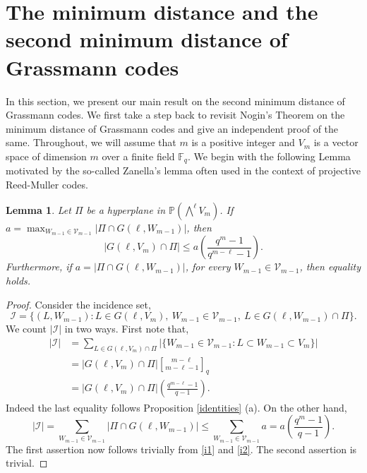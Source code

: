 \documentclass[10pt,a4paper,oneside]{amsproc}
\newtheorem{lemma}[theorem]{Lemma}
\newcommand{\Fq}{\mathbb{F}_q}
\def\Fq{{\mathbb F}_q}
\def\PP{{\mathbb P}}
\newcommand{\V}{{\mathcal{V}}}
\begin{document}
\section{The minimum distance and the second minimum distance of Grassmann codes}\label{sec:main}
In this section, we present our main result on the second minimum distance of Grassmann codes. We first take a step back to revisit Nogin's Theorem on the minimum distance of Grassmann codes and give an independent proof of the same. Throughout, we will assume that $m$ is a positive integer and $V_m$ is a vector space of dimension $m$ over a finite field $\Fq$. 
We begin with the following Lemma motivated by the so-called Zanella's lemma often used in the context of projective Reed-Muller codes. 
\begin{lemma}\label{zan}
    Let $\Pi$ be a hyperplane in $\PP\left(\bigwedge^{\ell} V_m \right)$. If $a = \displaystyle{\max_{W_{m-1} \in \V_{m-1}}} |\Pi \cap G (\ell, W_{m-1})|$, then $$|G(\ell, V_m) \cap \Pi| \le a \left(\frac{q^ m - 1}{q^{m - \ell} - 1}\right).$$
    Furthermore, if $a = |\Pi \cap G (\ell, W_{m-1})|$, for every $W_{m-1} \in \V_{m-1}$, then equality holds.
\end{lemma}

\begin{proof}
    Consider the incidence set,
    $$\mathscr{I} = \{(L, W_{m-1}) : L \in G(\ell, V_{m}), \  W_{m-1} \in \V_{m-1}, \ L \in G(\ell, W_{m-1}) \cap \Pi \}.$$
    We count $|\mathscr{I}|$ in two ways. First note that,
    \begin{align}\label{i1}
        |\mathscr{I}| &= \sum_{L \in G(\ell, V_m) \cap \Pi} |\{W_{m-1} \in \V_{m-1}: L \subset W_{m-1} \subset V_m\}| \nonumber  \\
        &= |G(\ell, V_m) \cap \Pi| {m-\ell \brack m - \ell - 1}_q \nonumber \\
        &= |G(\ell, V_m) \cap \Pi| \left(\frac{q^{m - \ell} - 1}{q-1}\right). 
    \end{align}
Indeed the last equality follows Proposition \ref{identities} (a). 
    On the other hand, 
    \begin{equation}\label{i2}
        |\mathscr{I}| = \sum_{W_{m-1} \in \V_{m-1}} |\Pi \cap G(\ell, W_{m-1})| \le \sum_{{W_{m-1} \in \V_{m-1}}} a = a \left(\frac{q^m - 1}{q - 1}\right).
    \end{equation}
    The first assertion now follows trivially from \eqref{i1} and \eqref{i2}. The second assertion is trivial. 
\end{proof}
\end{document}
